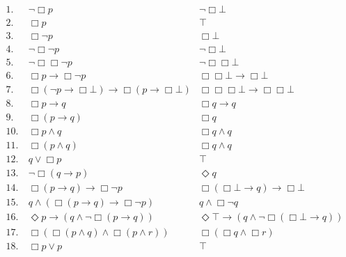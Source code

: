 \documentclass[../main.tex]{subfiles}
\begin{document}
\begin{align*}
	1. &\ \neg\Box p & \neg\Box\bot\\
	2. &\ \Box p & \top\\
	3. &\ \Box\neg p & \Box\bot\\
	4. &\ \neg\Box\neg p & \neg\Box\bot\\
	5. &\ \neg\Box\Box\neg p & \neg\Box\Box\bot\\
	6. &\ \Box p \rightarrow\Box\neg p & \Box\Box\bot\rightarrow\Box\bot\\
	7. &\ \Box (\neg
	p\rightarrow\Box\bot)\rightarrow\Box(p\rightarrow\Box\bot) &
	\Box\Box\Box\bot\rightarrow\Box\Box\bot\\
	8. &\ \Box p\rightarrow q & \Box q\rightarrow q\\
	9. &\ \Box(p\rightarrow q) & \Box q\\
	10. &\ \Box p\wedge q & \Box q\wedge q\\
	11. &\ \Box(p\wedge q) & \Box q\wedge q\\
	12. &\ q\vee \Box p & \top\\	
	13. &\ \neg\Box(q\rightarrow p) & \Diamond q\\
	14. &\ \Box(p\rightarrow q)\rightarrow\Box\neg p &
	\Box(\Box\bot\rightarrow q)\rightarrow\Box\bot\\
	15. &\ q\wedge(\Box(p\rightarrow q)\rightarrow\Box\neg p) &
	q\wedge\Box\neg q\\
	16. &\ \Diamond p\rightarrow(q\wedge\neg\Box(p\rightarrow q)) &
	\Diamond\top \rightarrow (q\wedge\neg\Box(\Box\bot\rightarrow q))\\
	17. &\ \Box(\Box(p\wedge q)\wedge\Box(p\wedge r)) & \Box(\Box q \wedge
	\Box r)\\
	18. &\ \Box p\vee p & \top
\end{align*}
\begingroup\vspace*{-\baselineskip}
\label{Fig}
\vspace*{\baselineskip}\endgroup
\end{document}
